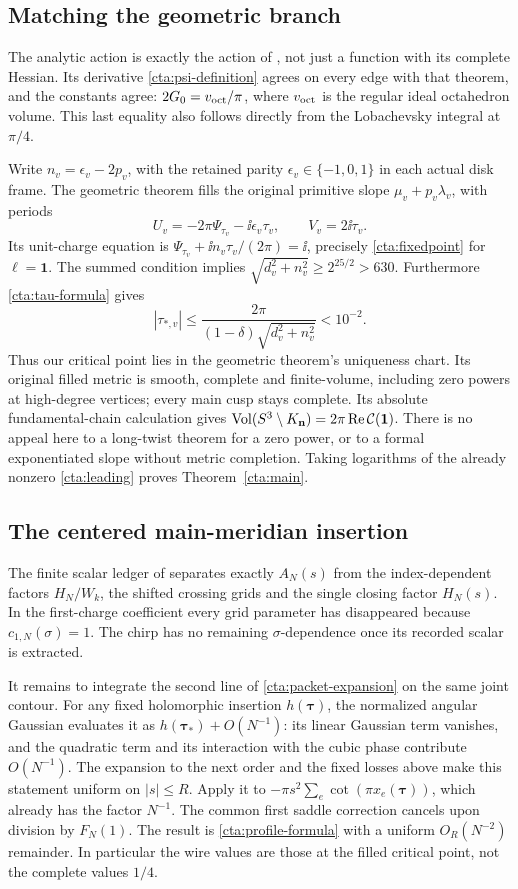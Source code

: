 \subsection{Matching the geometric branch}
The analytic action is exactly the action of
\cite[Theorem~1.1]{Geometry}, not just a function with its
complete Hessian. Its derivative \eqref{cta:psi-definition}
agrees on every edge with that theorem, and the constants agree:
\(2G_0=v_{\rm oct}/\pi\), where \(v_{\rm oct}\) is the regular
ideal octahedron volume. This last equality also follows directly
from the Lobachevsky integral at \(\pi/4\).

Write \(n_v=\epsilon_v-2p_v\), with the retained parity
\(\epsilon_v\in\{-1,0,1\}\) in each actual disk frame.
The geometric theorem fills the original primitive slope
\(\mu_v+p_v\lambda_v\), with periods
\[
 U_v=-2\pi\Psi_{\tau_v}-\ii\epsilon_v\tau_v,\qquad
 V_v=2\ii\tau_v.
\]
Its unit-charge equation is
\(\Psi_{\tau_v}+\ii n_v\tau_v/(2\pi)=\ii\), precisely
\eqref{cta:fixedpoint} for \(\boldsymbol\ell=\mathbf1\).
The summed condition implies
\(\sqrt{d_v^2+n_v^2}\ge2^{25/2}>630\).
Furthermore \eqref{cta:tau-formula} gives
\[
 |\tau_{*,v}|\le
 \frac{2\pi}{(1-\delta)\sqrt{d_v^2+n_v^2}}<10^{-2}.
\]
Thus our critical point lies in the geometric theorem's
uniqueness chart. Its original filled metric is smooth,
complete and finite-volume, including zero powers at high-degree
vertices; every main cusp stays complete. Its absolute
fundamental-chain calculation gives
\(\operatorname{Vol}(S^3\setminus K_{\mathbf n})=2\pi\operatorname{Re}\mathcal C(\mathbf1)\).
There is no appeal here to a long-twist theorem for a zero
power, or to a formal exponentiated slope without metric completion.
Taking logarithms of the already nonzero
\eqref{cta:leading} proves Theorem~\ref{cta:main}.

\subsection{The centered main-meridian insertion}
The finite scalar ledger of \cite[Proposition~8.1]{Meridian}
separates exactly \(A_N(s)\) from the index-dependent factors
\(H_N/W_k\), the shifted crossing grids and the single closing
factor \(H_N(s)\). In the first-charge coefficient every grid
parameter has disappeared because \(c_{1,N}(\sigma)=1\).
The chirp has no remaining \(\sigma\)-dependence once its
recorded scalar is extracted.

It remains to integrate the second line of
\eqref{cta:packet-expansion} on the same joint contour.
For any fixed holomorphic insertion \(h(\boldsymbol\tau)\),
the normalized angular Gaussian evaluates it as
\(h(\boldsymbol\tau_*)+O(N^{-1})\): its linear Gaussian
term vanishes, and the quadratic term and its interaction
with the cubic phase contribute \(O(N^{-1})\).
The expansion to the next order and the fixed losses above
make this statement uniform on \(|s|\le R\).
Apply it to
\(-\pi s^2\sum_e\cot(\pi x_e(\boldsymbol\tau))\),
which already has the factor \(N^{-1}\).
The common first saddle correction cancels upon division
by \(F_N(1)\). The result is \eqref{cta:profile-formula}
with a uniform \(O_R(N^{-2})\) remainder.
In particular the wire values are those at the filled
critical point, not the complete values \(1/4\).

